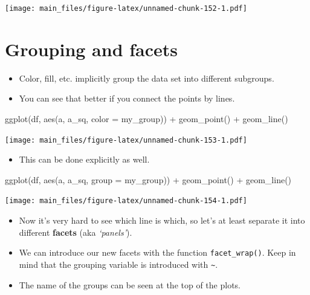 \documentclass[
]{book}
\newenvironment{Shaded}{\begin{snugshade}}{\end{snugshade}}
\newcommand{\AttributeTok}[1]{\textcolor[rgb]{0.77,0.63,0.00}{#1}}
\newcommand{\FunctionTok}[1]{\textcolor[rgb]{0.00,0.00,0.00}{#1}}
\newcommand{\NormalTok}[1]{#1}
\newcommand{\SpecialCharTok}[1]{\textcolor[rgb]{0.00,0.00,0.00}{#1}}
\providecommand{\tightlist}{%
  \setlength{\itemsep}{0pt}\setlength{\parskip}{0pt}}
\begin{document}
\texttt{[image: main\_files/figure-latex/unnamed-chunk-152-1.pdf]}

\hypertarget{grouping-and-facets}{%
\section{Grouping and facets}\label{grouping-and-facets}}

\begin{itemize}
\tightlist
\item
  Color, fill, etc. implicitly group the data set into different subgroups.
\item
  You can see that better if you connect the points by lines.
\end{itemize}

\begin{Shaded}
\begin{Highlighting}[]
\FunctionTok{ggplot}\NormalTok{(df, }\FunctionTok{aes}\NormalTok{(a, a\_sq, }\AttributeTok{color =}\NormalTok{ my\_group)) }\SpecialCharTok{+} \FunctionTok{geom\_point}\NormalTok{()  }\SpecialCharTok{+} \FunctionTok{geom\_line}\NormalTok{()}
\end{Highlighting}
\end{Shaded}

\texttt{[image: main\_files/figure-latex/unnamed-chunk-153-1.pdf]}

\begin{itemize}
\tightlist
\item
  This can be done explicitly as well.
\end{itemize}

\begin{Shaded}
\begin{Highlighting}[]
\FunctionTok{ggplot}\NormalTok{(df, }\FunctionTok{aes}\NormalTok{(a, a\_sq, }\AttributeTok{group =}\NormalTok{ my\_group)) }\SpecialCharTok{+} \FunctionTok{geom\_point}\NormalTok{()  }\SpecialCharTok{+} \FunctionTok{geom\_line}\NormalTok{()}
\end{Highlighting}
\end{Shaded}

\texttt{[image: main\_files/figure-latex/unnamed-chunk-154-1.pdf]}

\begin{itemize}
\tightlist
\item
  Now it's very hard to see which line is which, so let's at least separate it into different \textbf{facets} (aka \emph{`panels'}).
\item
  We can introduce our new facets with the function \texttt{facet\_wrap()}. Keep in mind that the grouping variable is introduced with \texttt{\textasciitilde{}}.
\item
  The name of the groups can be seen at the top of the plots.
\end{itemize}
\end{document}
